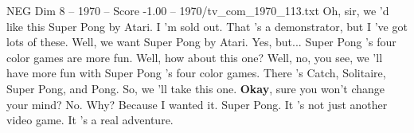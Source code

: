 \begin{textsample}{NEG Dim 8 – 1970 – Score -1.00 – 1970/tv\_com\_1970\_113.txt}  \label{ex:f8_neg_019}
Oh, sir, we 'd like this Super Pong by Atari.
I 'm sold out.
That 's a demonstrator, but I 've got lots of these.
Well, we want Super Pong by Atari.
Yes, but...
Super Pong 's four color games are more fun.
Well, how about this one?
Well, no, you see, we 'll have more fun with Super Pong 's four color games.
There 's Catch, Solitaire, Super Pong, and Pong.
So, we 'll take this one. \textbf{Okay}, sure you won't change your mind?
No.
Why?
Because I wanted it.
Super Pong.
It 's not just another video game.
It 's a real adventure.

\end{textsample}
